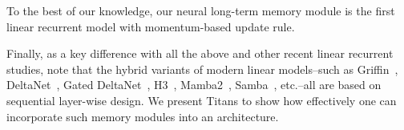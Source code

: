 \documentclass{article}
\newcommand{\citep}{\parencite}
\begin{document}
To the best of our knowledge, our neural long-term memory module is the first linear recurrent model with momentum-based update rule. 

Finally, as a key difference with all the above and other recent linear recurrent studies, note that the hybrid variants of modern linear models–such as Griffin~\citep{de2024griffin}, DeltaNet~\citep{yang2024parallelizing}, Gated DeltaNet~\citep{yang2024gated}, H3~\citep{fu2023hungry}, Mamba2~\citep{dao2024transformers}, Samba~\citep{ren2024samba}, etc.–all are based on sequential layer-wise design. We present Titans to show how effectively one can incorporate such memory modules into an architecture.
\end{document}
